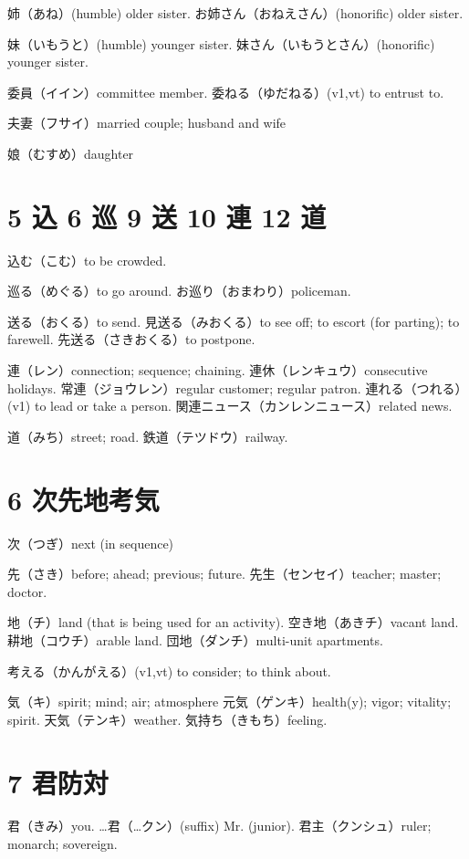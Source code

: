 姉（あね）(humble) older sister.
お姉さん（おねえさん）(honorific) older sister.

妹（いもうと）(humble) younger sister.
妹さん（いもうとさん）(honorific) younger sister.

委員（イイン）committee member.
委ねる（ゆだねる）(v1,vt) to entrust to.

夫妻（フサイ）married couple; husband and wife

娘（むすめ）daughter

\section{5 込 6 巡 9 送 10 連 12 道}

込む（こむ）to be crowded.

巡る（めぐる）to go around.
お巡り（おまわり）policeman.

送る（おくる）to send.
見送る（みおくる）to see off; to escort (for parting); to farewell.
先送る（さきおくる）to postpone.

連（レン）connection; sequence; chaining.
連休（レンキュウ）consecutive holidays.
常連（ジョウレン）regular customer; regular patron.
連れる（つれる）(v1) to lead or take a person.
関連ニュース（カンレンニュース）related news.

道（みち）street; road.
鉄道（テツドウ）railway.

\section{6 次先地考気}

次（つぎ）next (in sequence)

先（さき）before; ahead; previous; future.
先生（センセイ）teacher; master; doctor.

地（チ）land (that is being used for an activity).
空き地（あきチ）vacant land.
耕地（コウチ）arable land.
団地（ダンチ）multi-unit apartments.

考える（かんがえる）(v1,vt) to consider; to think about.

気（キ）spirit; mind; air; atmosphere
元気（ゲンキ）health(y); vigor; vitality; spirit.
天気（テンキ）weather.
気持ち（きもち）feeling.

\section{7 君防対}

君（きみ）you.
…君（…クン）(suffix) Mr. (junior).
君主（クンシュ）ruler; monarch; sovereign.

